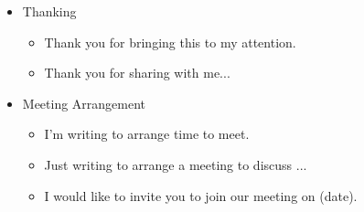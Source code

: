 \begin{itemize}
\begin{itemize}
	\end{itemize}
\item Thanking
	\begin{itemize}
	\item Thank you for bringing this to my attention.
	\item Thank you for sharing with me...	
	\end{itemize}
\item Meeting Arrangement
	\begin{itemize}
	\item I'm writing to arrange time to meet.
	\item Just writing to arrange a meeting to discuss ...
	\item I would like to invite you to join our meeting on (date).
	\end{itemize}

\end{itemize}